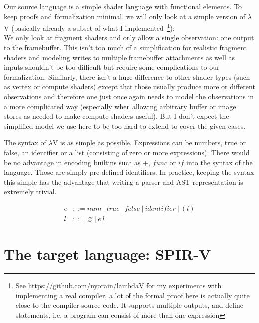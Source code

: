 \documentclass[letterpaper,12pt]{article}
\begin{document}
Our source language is a simple shader language with functional elements.
To keep proofs and formalization minimal, we will only look at a simple
version of $\lambda$V (basically already a subset of what I implemented~\footnote{See 
\url{https://github.com/nyorain/lambdaV} for my experiments with implementing
a real compiler, a lot of the formal proof here is actually quite close
to the compiler source code. It supports multiple outputs, and
define statements, i.e. a program can consist of more than one
expression}): \\
We only look at fragment shaders and only allow a single observation:
one output to the framebuffer. This isn't too much of a simplification
for realistic fragment shaders and modeling writes to multiple framebuffer attachments
as well as inputs shouldn't be too difficult but require some complications
to our formalization.
Similarly, there isn't a huge difference to other shader types (such as 
vertex or compute shaders) except that those usually produce more or
different observations and therefore one just once again needs to model the
observations in a more complicated way (especially when allowing
arbitrary buffer or image stores as needed to make compute shaders
useful). But I don't expect the simplified model we use here to be too hard
to extend to cover the given cases.

The syntax of $\lambda$V is as simple as possible. Expressions
can be numbers, true or false, an identifier or a list (consisting of zero or
more expressions). There would be no advantage in encoding builtins such
as $+$, $func$ or $if$ into the syntax of the language. Those are simply
pre-defined identifiers. In practice, keeping the syntax this simple has 
the advantage that writing a parser and AST representation is extremely trivial.

\begin{align*}
	e &::= num \:|\: true \:|\: false \:|\: \textit{identifier} \:|\: (l) \\
	l &::= \varnothing \:|\: e\:l
\end{align*}


\section{The target language: SPIR-V}
\end{document}
